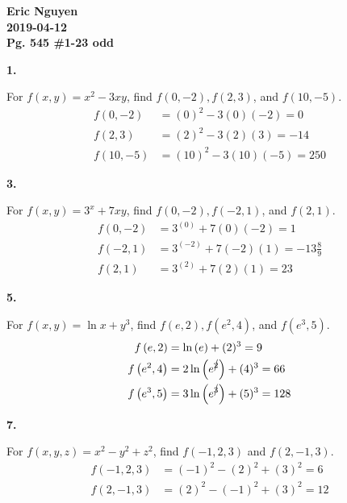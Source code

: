 \documentclass[12pt]{article}
\newenvironment{problem}[2][]{
    \begin{trivlist}
        \item[
            {\bfseries #1}
            {\bfseries #2.}
        ]
}{\end{trivlist}}
\newcommand{\assignment}{Pg. 545 \#1-23 odd}
\newcommand{\name}{Eric Nguyen}
\newcommand{\duedate}{2019-04-12}
\newcommand{\details}{\noindent\textbf{\name \\\duedate \\\assignment}}
\begin{document}
\details

\begin{problem}{1}
For $f\left(x,y\right) = x^2 - 3xy$, find $f\left(0, -2\right), f\left(2, 3\right)$, and $f\left(10, -5\right)$.
\begin{align}
f\left(0, -2\right) &= \left(0\right)^2 - 3\left(0\right)\left(-2\right) = 0 \\
f\left(2, 3\right) &= \left(2\right)^2 - 3\left(2\right)\left(3\right) = -14 \\
f\left(10, -5\right) &= \left(10\right)^2 - 3\left(10\right)\left(-5\right) = 250
\end{align}
\end{problem}

\begin{problem}{3}
For $f\left(x,y\right) = 3^x + 7xy$, find $f\left(0, -2\right), f\left(-2, 1\right)$, and $f\left(2, 1\right)$.
\begin{align}
f\left(0, -2\right) &= 3^{\left(0\right)} + 7\left(0\right)\left(-2\right) = 1 \\
f\left(-2, 1\right) &= 3^{\left(-2\right)} + 7\left(-2\right)\left(1\right) = -13 \frac{8}{9}  \\
f\left(2, 1\right) &= 3^{\left(2\right)} + 7\left(2\right)\left(1\right) = 23
\end{align}
\end{problem}

\begin{problem}{5}
For $f\left(x,y\right) = \ln x + y^3$, find $f\left(e, 2\right), f\left(e^2, 4\right)$, and $f\left(e^3, 5\right)$.
\begin{align}
f\left(e, 2\right) &= \ln \left(e\right) + (2)^3 = 9 \\
f\left(e^2, 4\right) &= 2 \ln \left(e^{\cancel{2}}\right) + (4)^3 = 66 \\
f\left(e^3, 5\right) &= 3 \ln \left(e^{\cancel{3}}\right) + (5)^3 = 128
\end{align}
\end{problem}

\begin{problem}{7}
For $f\left(x,y,z\right) = x^2 - y^2 + z^2$, find $f\left(-1, 2, 3\right)$ and $f\left(2, -1, 3\right)$.
\begin{align}
f\left(-1, 2, 3\right) &= \left(-1\right)^2 - \left(2\right)^2 + \left(3\right)^2 = 6 \\
f\left(2, -1, 3\right) &= \left(2\right)^2 - \left(-1\right)^2 + \left(3\right)^2 = 12
\end{align}
\end{problem}
\end{document}
